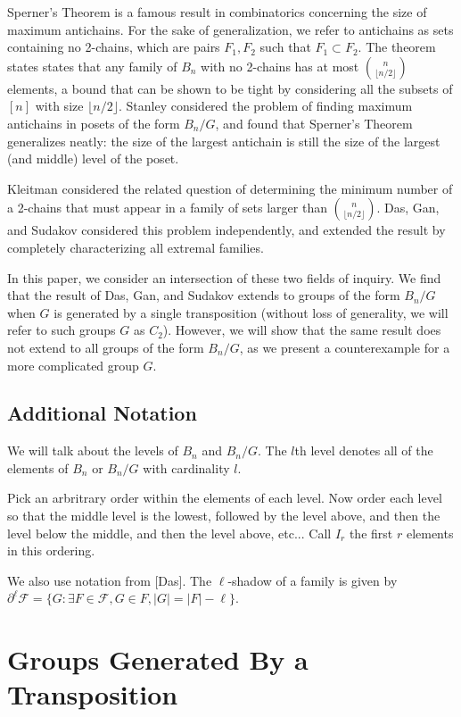 \documentclass[12pt]{article}
\theoremstyle{plain}
\theoremstyle{definition}
\theoremstyle{remark}
\newcommand{\F}{\mathcal{F}}
\begin{document}
Sperner's Theorem is a famous result in combinatorics concerning the size of maximum antichains. For the sake of generalization, we refer to antichains as sets containing no 2-chains, which are pairs $F_1, F_2$ such that $F_1 \subset F_2$. The theorem states states that any family of $B_n$ with no 2-chains has at most $\binom{n}{\lfloor n/2 \rfloor}$ elements, a bound that can be shown to be tight by considering all the subsets of $[n]$ with size $\lfloor n/2 \rfloor$. Stanley considered the problem of finding maximum antichains in posets of the form $B_n / G$, and found that Sperner's Theorem generalizes neatly: the size of the largest antichain is still the size of the largest (and middle) level of the poset.

Kleitman considered the related question of determining the minimum number of a 2-chains that must appear in a family of sets larger than $\binom{n}{\lfloor n/2 \rfloor}$. Das, Gan, and Sudakov considered this problem independently, and extended the result by completely characterizing all extremal families. 

In this paper, we consider an intersection of these two fields of inquiry. We find that the result of Das, Gan, and Sudakov extends to groups of the form $B_n / G$ when $G$ is generated by a single transposition (without loss of generality, we will refer to such groups $G$ as $C_2$). However, we will show that the same result does not extend to all groups of the form $B_n / G$, as we present a counterexample for a more complicated group $G$. 

\subsection{Additional Notation}


We will talk about the levels of $B_n$ and $B_n/G$. The $l$th level denotes all of the elements of $B_n$ or $B_n/G$ with cardinality $l$. 

Pick an arbritrary order within the elements of each level. Now order each level so that the middle level is the lowest, followed by the level above, and then the level below the middle, and then the level above, etc... Call $I_r$ the first $r$ elements in this ordering. 

We also use notation from [Das]. The $\ell$-shadow of a family is given by $\partial^{\ell}\F = \{G: \exists F \in \F, G \in F, |G| = |F| - \ell\}$.

\section{Groups Generated By a Transposition}
\end{document}
